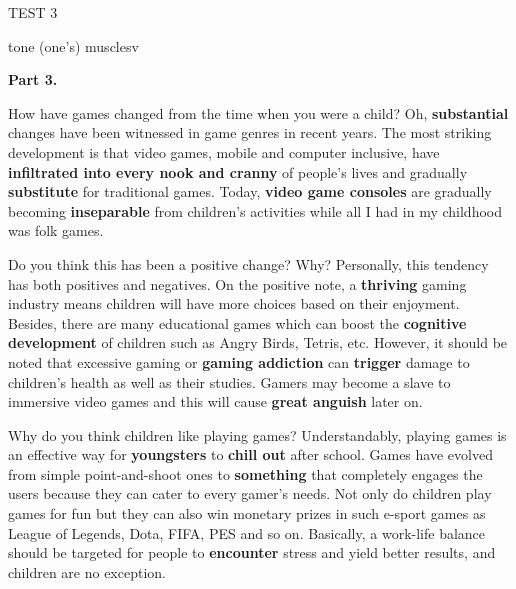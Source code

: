 \begin{glossarymc}[Cambridge 6]
\begin{test}{TEST 3}
\begin{VocabExplain}[Part 2]
            \begin{ExplainCard}{tone (one’s) muscles}{v}
            \end{ExplainCard}
        \end{VocabExplain}

    \noindent
    \textbf{Part 3.}
    \begin{qa}{How have games changed from the time when you were a child?}
    Oh, \textbf{substantial} changes have been witnessed in game genres in recent years. The most striking development is that video games, mobile and computer inclusive, have \textbf{infiltrated into every nook and cranny} of people's lives and gradually \textbf{substitute} for traditional games. Today, \textbf{video game consoles} are gradually becoming \textbf{inseparable} from children's activities while all I had in my childhood was folk games.
    \end{qa}

    \begin{qa}{Do you think this has been a positive change? Why?}
    Personally, this tendency has both positives and negatives. On the positive note, a \textbf{thriving} gaming industry means children will have more choices based on their enjoyment. Besides, there are many educational games which can boost the \textbf{cognitive development} of children such as Angry Birds, Tetris, etc. However, it should be noted that excessive gaming or \textbf{gaming addiction} can \textbf{trigger} damage to children's health as well as their studies. Gamers may become a slave to immersive video games and this will cause \textbf{great anguish} later on.
    \end{qa}

    \begin{qa}{Why do you think children like playing games?}
    Understandably, playing games is an effective way for \textbf{youngsters} to \textbf{chill out} after school. Games have evolved from simple point-and-shoot ones to \textbf{something} that completely engages the users because they can cater to every gamer's needs. Not only do children play games for fun but they can also win monetary prizes in such e-sport games as League of Legends, Dota, FIFA, PES and so on. Basically, a work-life balance should be targeted for people to \textbf{encounter} stress and yield better results, and children are no exception.
    \end{qa}


\end{test}
\end{glossarymc}
